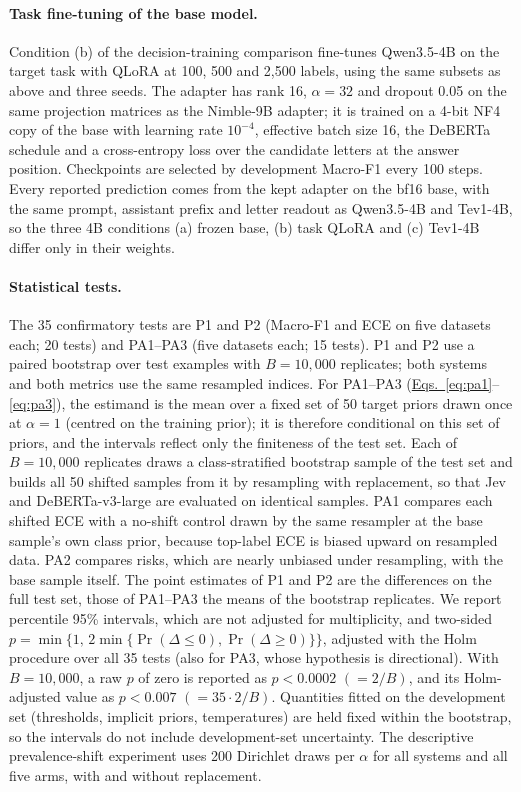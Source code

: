 \paragraph{Task fine-tuning of the base model.}
Condition (b) of the decision-training comparison fine-tunes Qwen3.5-4B on the target task with QLoRA
\citep{hu2022lora,dettmers2023qlora} at 100, 500 and 2{,}500 labels, using the same subsets as above and three seeds. The
adapter has rank 16, $\alpha=32$ and dropout 0.05 on the same projection matrices as the Nimble-9B adapter; it is trained
on a 4-bit NF4 copy of the base with learning rate $10^{-4}$, effective batch size 16, the DeBERTa schedule and a
cross-entropy loss over the candidate letters at the answer position. Checkpoints are selected by development Macro-F1
every 100 steps. Every reported prediction comes from the kept adapter on the bf16 base, with the same prompt, assistant
prefix and letter readout as Qwen3.5-4B and Tev1-4B, so the three 4B conditions (a) frozen base, (b) task QLoRA and (c)
Tev1-4B differ only in their weights.

\paragraph{Statistical tests.}
The 35 confirmatory tests are P1 and P2 (Macro-F1 and ECE on five datasets each; 20 tests) and PA1--PA3 (five datasets
each; 15 tests). P1 and P2 use a paired bootstrap over test examples with $B=10{,}000$ replicates; both systems and both
metrics use the same resampled indices. For PA1--PA3 (\hyperref[eq:pa1]{Eqs.~\ref*{eq:pa1}}--\nobreak\ref{eq:pa3}), the estimand is the mean over a fixed set of 50 target priors
drawn once at $\alpha=1$ (centred on the training prior); it is therefore conditional on this set of priors, and the
intervals reflect only the finiteness of the test set. Each of $B=10{,}000$ replicates draws a class-stratified bootstrap
sample of the test set and builds all 50 shifted samples from it by resampling with replacement, so that Jev and
DeBERTa-v3-large are evaluated on identical samples. PA1 compares each shifted ECE with a no-shift control drawn by the
same resampler at the base sample's own class prior, because top-label ECE is biased upward on resampled data. PA2
compares risks, which are nearly unbiased under resampling, with the base sample itself. The point estimates of P1 and P2 are the differences on the full test set, those of
PA1--PA3 the means of the bootstrap replicates. We report percentile 95\% intervals,
which are not adjusted for multiplicity, and two-sided $p=\min\{1,\,2\min\{\Pr(\Delta\le0),\Pr(\Delta\ge0)\}\}$, adjusted with the
Holm procedure \citep{holm1979simple} over all 35 tests (also for PA3, whose hypothesis is directional). With
$B=10{,}000$, a raw $p$ of zero is reported as $p<0.0002$ $(=2/B)$, and its Holm-adjusted value as $p<0.007$
$(=35\cdot2/B)$. Quantities fitted on the development set (thresholds, implicit priors, temperatures) are held fixed
within the bootstrap, so the intervals do not include development-set uncertainty. The descriptive prevalence-shift
experiment uses 200 Dirichlet draws per $\alpha$ for all systems and all five arms, with and without replacement.

